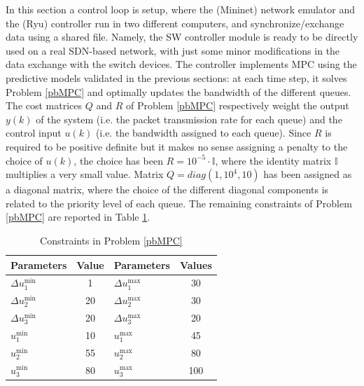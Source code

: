 In this section a control loop is setup, where the (Mininet) network emulator and the (Ryu) controller run in two different computers, and synchronize/exchange data using a shared file. Namely, the SW controller module is ready to be directly used on a real SDN-based network, with just some minor modifications in the data exchange with the switch devices. The controller implements MPC using the predictive models validated in the previous sections: at each time step, it solves Problem \ref{pbMPC} and optimally updates the bandwidth of the different queues. The cost matrices $Q$ and $R$ of Problem \ref{pbMPC} respectively weight the output $y(k)$ of the system (i.e. the packet transmission rate for each queue) and the control input $u(k)$ (i.e. the bandwidth assigned to each queue). Since $R$ is required to be positive definite but it makes no sense assigning a penalty to the choice of $u(k)$, the choice has been $R=10^{-5} \cdot \mathbb I$, where the identity matrix $\mathbb I$ multiplies a very small value. Matrix $Q = diag(1,10^4,10)$ has been assigned as a diagonal matrix, where the choice of the different diagonal components is related to the priority level of each queue. The remaining constraints of Problem \ref{pbMPC} are reported in Table \ref{tab:contPar}.
\begin{table}[h!]
	\caption{Constraints in Problem \ref{pbMPC}}
	\centering
	\begin{tabular}{l c l c}
		\hline\hline
		Parameters                                & Value               & Parameters                 & Values       \\ 
		\hline
		$\Delta u_1^\mathrm{min}$     & 1                   & $\Delta u_1^\mathrm{max}$  & 30           \\
		$\Delta u_2^\mathrm{min}$     & 20                  & $\Delta u_2^\mathrm{max}$  & 30           \\
		$\Delta u_3^\mathrm{min}$     & 20                  & $\Delta u_3^\mathrm{max}$  & 20           \\
		$u_1^\mathrm{min} $             & 10                  & $u_1^\mathrm{max} $        & 45           \\
		$u_2^\mathrm{min} $            & 55                  & $u_2^\mathrm{max} $        & 80           \\
		$u_3^\mathrm{min} $            & 80                  & $u_3^\mathrm{max} $        & 100          \\
		
		\hline
	\end{tabular}
	\label{tab:contPar}
\end{table}
